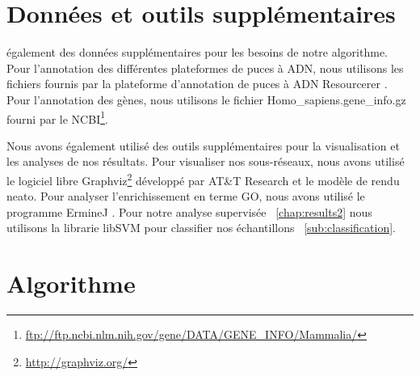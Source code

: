 	\section{\textcolor{green!45!black}{Données et outils supplémentaires}}
		 également des données supplémentaires pour les besoins de notre algorithme.
			Pour l'annotation des différentes plateformes de puces à \acs{ADN}, nous utilisons les fichiers fournis par la plateforme d'annotation de puces à \acs{ADN} Resourcerer \citep{Tsai2001}.
			Pour l'annotation des gènes, nous utilisons le fichier Homo\_sapiens.gene\_info.gz fourni par le \acs{NCBI}\footnote{\url{ftp://ftp.ncbi.nlm.nih.gov/gene/DATA/GENE_INFO/Mammalia/}}.

			Nous avons également utilisé des outils supplémentaires pour la visualisation et les analyses de nos résultats.
			Pour visualiser nos sous-réseaux, nous avons utilisé le logiciel libre Graphviz\footnote{\url{http://graphviz.org/}} développé par AT\&T Research et le modèle de rendu neato.
			Pour analyser l'enrichissement en terme GO, nous avons utilisé le programme ErmineJ \citep{Gillis2010}.
			Pour notre analyse supervisée ~\ref{chap:results2} nous utilisons la librarie libSVM \citep{Chang2007} pour classifier nos échantillons ~\ref{sub:classification}.

	\section{\textcolor{green!45!black}{Algorithme}}

